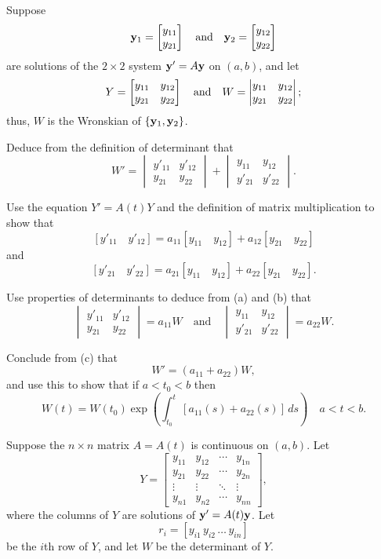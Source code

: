 \begin{exerciselist}
\item\label{exer:10.3.4}Suppose
\[
\mathbf{y}_1=\begin{bmatrix}y_{11}\\y_{21}\end{bmatrix}\quad\text{and}\quad 
\mathbf{y}_2=\begin{bmatrix}y_{12}\\y_{22}\end{bmatrix}
\]
are solutions of the $2\times 2$ system $\mathbf{y}'=A\mathbf{y}$ on
$(a,b)$, and let
\[
 Y=\begin{bmatrix}y_{11}&y_{12}\\y_{21}&y_{22}\end{bmatrix}\quad\text{and}\quad 
W=\begin{vmatrix} y_{11}&y_{12}\\y_{21}&y_{22}\end{vmatrix};
\]
thus, $W$ is the Wronskian of $\{\mathbf{y}_1,\mathbf{y}_2\}$.
\begin{alist}
\item %
 Deduce from the definition of  determinant that
\[
W'=\begin{vmatrix}
y'_{11}&y'_{12}\\
y_{21}&y_{22}
\end{vmatrix}
+\begin{vmatrix}
y_{11}&y_{12}\\
y'_{21}&y'_{22}
\end{vmatrix}.
\]

\item %
 Use the equation $Y'=A(t)Y$ and
the definition of matrix multiplication to show that
\[
[y'_{11}\quad y'_{12}]=a_{11} [y_{11}\quad y_{12}]+a_{12} [y_{21}
\quad y_{22}]
\]
and
\[
[y'_{21}\quad  y'_{22}]=a_{21} [y_{11}\quad y_{12}]+a_{22}
[y_{21}\quad y_{22}].
\]
\item %
 Use  properties of determinants to deduce from (a) and (b) that
\[
\begin{vmatrix}y'_{11}&y'_{12}\\y_{21}&y_{22}\end{vmatrix}
=a_{11}W\quad\text{and}\quad 
\begin{vmatrix}
y_{11}&y_{12}\\
y'_{21}&y'_{22}
\end{vmatrix}=a_{22}W.
\]

\item %
 Conclude from (c) that
\[
W'=(a_{11}+a_{22})W,
\]
and use this to show that if $a<t_0<b$  then
\[
W(t)=W(t_0)\exp\left(\int^t_{t_0} \left[a_{11}(s)+a_{22} (s)
\right]\, ds\right)\quad a<t<b.
\]
\end{alist}

\item\label{exer:10.3.5}Suppose  the $n\times n$ matrix $A=A(t)$ is continuous on $(a,b)$. Let
\[
 Y=
\begin{bmatrix}
y_{11}&y_{12}&\cdots&y_{1n} \\
y_{21}&y_{22}&\cdots&y_{2n} \\
\vdots&\vdots&\ddots&\vdots \\
y_{n1}&y_{n2}&\cdots&y_{nn}
\end{bmatrix},
\]
where the columns of $Y$ are solutions of $\mathbf{y}'=A(t)\mathbf{y}$. Let
\[
r_i=[y_{i1}\, y_{i2}\, \dots\, y_{in}]
\]
be the $i$th row of $Y$, and let $W$ be the determinant of $Y$.


\end{exerciselist}
